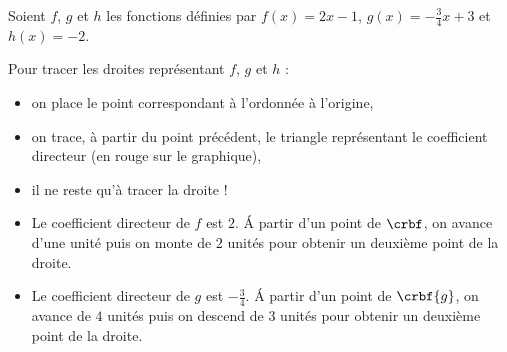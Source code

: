 \setcounter{exm}{3}

\begin{exm}
Soient $f$, $g$ et $h$ les fonctions définies par  $f(x)=2x-1$, $g(x)=-\frac34x+3$ et $h(x) = -2$.

Pour tracer les droites représentant $f$, $g$ et $h$ :
    \begin{itemize}
    \item on place le point correspondant à l'ordonnée à l'origine,
    \item on trace, à partir du point précédent, le triangle  représentant le coefficient directeur (en rouge sur le graphique),
    \item il ne reste qu'à tracer la droite !
    \end{itemize}
    
    \begin{rmq}
        \begin{itemize}
        \item Le coefficient directeur de $f$ est $2$. \'A partir d'un point de $\crbf$, on avance d'une unité puis on monte de $2$ unités pour obtenir un deuxième point de la droite.
        \item Le coefficient directeur de $g$ est $-\frac34$. \'A partir d'un point de $\crbf{g}$, on avance de $4$ unités puis on descend de $3$ unités pour obtenir un deuxième point de la droite.
        \end{itemize}

    \end{rmq}

\end{exm}
